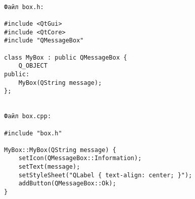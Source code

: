 \begin{verbatim}

Файл box.h:

#include <QtGui>
#include <QtCore>
#include "QMessageBox"

class MyBox : public QMessageBox {
    Q_OBJECT
public:
    MyBox(QString message);
};


Файл box.cpp:

#include "box.h"

MyBox::MyBox(QString message) {
    setIcon(QMessageBox::Information);
    setText(message);
    setStyleSheet("QLabel { text-align: center; }");
    addButton(QMessageBox::Ok);
}
\end{verbatim}
